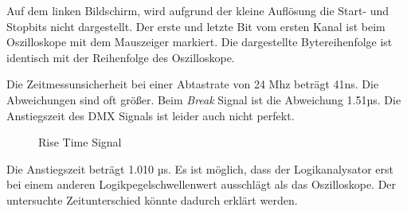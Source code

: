 Auf dem linken Bildschirm, wird aufgrund der kleine Auflösung die Start- und Stopbits nicht dargestellt. Der erste und letzte Bit vom ersten Kanal ist beim Oszilloskope mit dem Mauszeiger markiert. Die dargestellte Bytereihenfolge ist identisch mit der Reihenfolge des Oszilloskope.

Die Zeitmessunsicherheit bei einer Abtastrate von 24 Mhz beträgt 41ns. Die Abweichungen sind oft größer. Beim \emph{Break} Signal ist die Abweichung 1.51µs. Die Anstiegszeit des DMX Signals ist leider auch nicht perfekt.

\begin{figure}[H]
	\centering
	\caption{Rise Time Signal}
\end{figure}

Die Anstiegszeit beträgt 1.010 µs. Es ist möglich, dass der Logikanalysator erst bei einem anderen Logikpegelschwellenwert ausschlägt als das Oszilloskope. Der untersuchte Zeitunterschied könnte dadurch erklärt werden.
